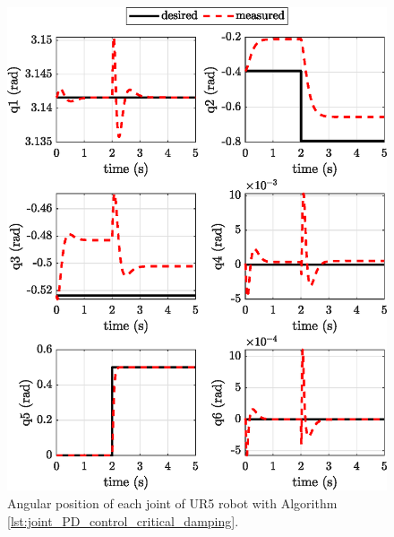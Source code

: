 \begin{figure}[H]
    \centering
    \includegraphics{images/act_1.5_step/joint_position.eps}
    \caption{Angular position of each joint of UR5 robot with Algorithm \ref{lst:joint_PD_control_critical_damping}.}
    \label{fig:act_1.5_joint_position}
\end{figure}

